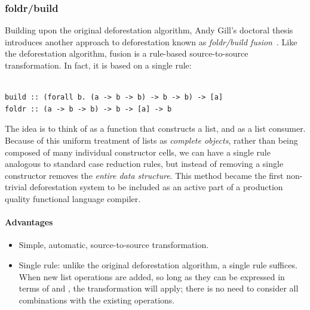 \subsubsection{foldr/build}

Building upon the original deforestation algorithm, Andy Gill's doctoral thesis
introduces another approach to deforestation known as \emph{foldr/build
fusion}~\cite{Gill:1996tf,Gill:1993de}.
Like the deforestation algorithm,  fusion is a rule-based
source-to-source transformation. In fact, it is based on a single rule:
%
\begin{lstlisting}[style=Haskell,numbers=none,mathescape,caption={The \code{foldr/build} transformation}]
%\bf$\langle$ foldr/build fusion $\rangle$% forall g k z. foldr k z (build g) $\mapsto$ g k z

build :: (forall b. (a -> b -> b) -> b -> b) -> [a]
foldr :: (a -> b -> b) -> b -> [a] -> b
\end{lstlisting}

The idea is to think of  as a function that constructs a list, and
 as a list consumer. Because of this uniform treatment of lists as
\emph{complete objects}, rather than being composed of many individual
constructor cells, we can have a single  rule analogous to
standard case reduction rules, but instead of removing a single constructor
removes the \emph{entire data structure}. This method became the first
non-trivial deforestation system to be included as an active part of a
production quality functional language compiler.

\paragraph{Advantages}
\begin{itemize}
    \item Simple, automatic, source-to-source transformation.


    \item Single rule: unlike the original deforestation algorithm, a single
        rule suffices. When new list operations are added, so long as they can
        be expressed in terms of  and , the
        transformation will apply; there is no need to consider all combinations
        with the existing operations.
\end{itemize}

